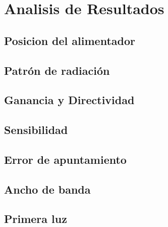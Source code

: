 \chapter{Analisis de Resultados}

\section{Posicion del alimentador}

\section{Patrón de radiación}

\section{Ganancia y Directividad}

\section{Sensibilidad}

\section{Error de apuntamiento}

\section{Ancho de banda}

\section{Primera luz}